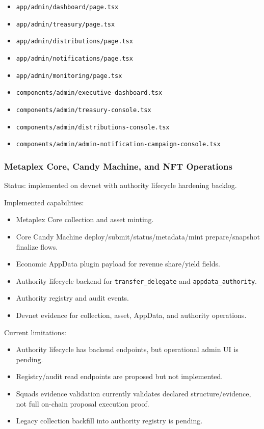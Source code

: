 \documentclass[
  10pt,
  letterpaper,
]{article}
\providecommand{\tightlist}{%
  \setlength{\itemsep}{0pt}\setlength{\parskip}{0pt}}
\let\oldtexttt\texttt
\renewcommand{\texttt}[1]{\oldtexttt{\small #1}}
\begin{document}
\begin{itemize}
\tightlist
\item
  \texttt{app/admin/dashboard/page.tsx}
\item
  \texttt{app/admin/treasury/page.tsx}
\item
  \texttt{app/admin/distributions/page.tsx}
\item
  \texttt{app/admin/notifications/page.tsx}
\item
  \texttt{app/admin/monitoring/page.tsx}
\item
  \texttt{components/admin/executive-dashboard.tsx}
\item
  \texttt{components/admin/treasury-console.tsx}
\item
  \texttt{components/admin/distributions-console.tsx}
\item
  \texttt{components/admin/admin-notification-campaign-console.tsx}
\end{itemize}

\subsubsection{Metaplex Core, Candy Machine, and NFT
Operations}\label{metaplex-core-candy-machine-and-nft-operations}

Status: implemented on devnet with authority lifecycle hardening
backlog.

Implemented capabilities:

\begin{itemize}
\tightlist
\item
  Metaplex Core collection and asset minting.
\item
  Core Candy Machine deploy/submit/status/metadata/mint prepare/snapshot
  finalize flows.
\item
  Economic AppData plugin payload for revenue share/yield fields.
\item
  Authority lifecycle backend for \texttt{transfer\_delegate} and
  \texttt{appdata\_authority}.
\item
  Authority registry and audit events.
\item
  Devnet evidence for collection, asset, AppData, and authority
  operations.
\end{itemize}

Current limitations:

\begin{itemize}
\tightlist
\item
  Authority lifecycle has backend endpoints, but operational admin UI is
  pending.
\item
  Registry/audit read endpoints are proposed but not implemented.
\item
  Squads evidence validation currently validates declared
  structure/evidence, not full on-chain proposal execution proof.
\item
  Legacy collection backfill into authority registry is pending.
\end{itemize}
\end{document}
